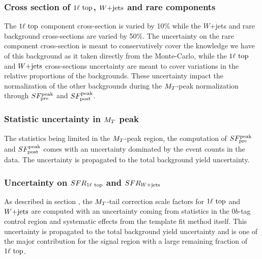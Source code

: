             \subsubsection{Cross section of $1\ell~\text{top}$, $\text{$W$+jets}$ and rare components}
        
            The $1\ell~\text{top}$ component cross-section is varied by 10\% while the $W$+jets 
            and rare background cross-sections are varied by 50\%. The uncertainty on the rare 
            component cross-section is meant to conservatively cover the knowledge we have of 
            this background as it taken directly from the Monte-Carlo, while the $1\ell~\text{top}$ and 
            $\text{$W$+jets}$ cross-sections uncertainty are meant to cover variations in the relative 
            proportions of the backgrounds. These uncertainty impact the normalization of the 
            other backgrounds during the $M_T$-peak normalization through $SF_{\text{pre}}^{\text{peak}}$ and $SF_{\text{post}}^{\text{peak}}$.

            \subsubsection{Statistic uncertainty in $M_T$ peak}
            
            The statistics being limited in the $M_T$-peak region, the computation of 
            $SF_{\text{pre}}^{\text{peak}}$ and $SF_{\text{post}}^{\text{peak}}$ comes with an uncertainty dominated by the event counts 
            in the data. The uncertainty is propagated to the total background yield uncertainty.

            \subsubsection{Uncertainty on $SFR_{1\ell~\text{top}}$ and $SFR_{\text{$W$+jets}}$}

            As described in section \label{sec:MTtailCorrection}, the $M_T$-tail correction
            scale factors for $1\ell~\text{top}$ and $\text{$W$+jets}$ are computed with an uncertainty
            coming from statistics in the $0b$-tag control region and systematic effects
            from the template fit method itself. This uncertainty is propagated to the total
            background yield uncertainty and is one of the major contribution for the signal
            region with a large remaining fraction of $1\ell~\text{top}$.

